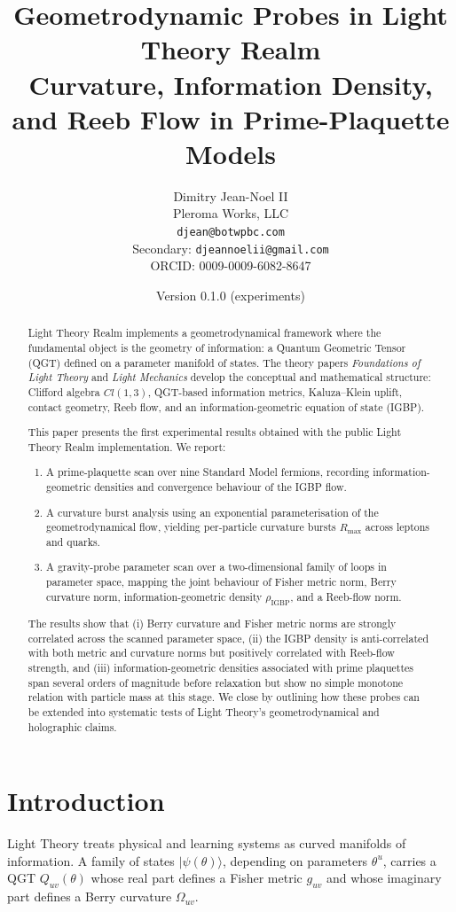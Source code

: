\documentclass[12pt]{article}
\title{Geometrodynamic Probes in Light Theory Realm\\
Curvature, Information Density, and Reeb Flow in Prime-Plaquette Models}
\author{Dimitry Jean-Noel II\\Pleroma Works, LLC\\\texttt{djean@botwpbc.com}\\Secondary: \texttt{djeannoelii@gmail.com}\\ORCID: 0009-0009-6082-8647}
\date{Version 0.1.0 (experiments)}
\begin{document}
\maketitle

\begin{abstract}
Light Theory Realm implements a geometrodynamical framework where the fundamental object is the geometry of information: a Quantum Geometric Tensor (QGT) defined on a parameter manifold of states. The theory papers \emph{Foundations of Light Theory} and \emph{Light Mechanics} develop the conceptual and mathematical structure: Clifford algebra $Cl(1,3)$, QGT-based information metrics, Kaluza--Klein uplift, contact geometry, Reeb flow, and an information-geometric equation of state (IGBP).

This paper presents the first experimental results obtained with the public Light Theory Realm implementation. We report:
\begin{enumerate}
    \item A prime-plaquette scan over nine Standard Model fermions, recording information-geometric densities and convergence behaviour of the IGBP flow.
    \item A curvature burst analysis using an exponential parameterisation of the geometrodynamical flow, yielding per-particle curvature bursts $R_{\max}$ across leptons and quarks.
    \item A gravity-probe parameter scan over a two-dimensional family of loops in parameter space, mapping the joint behaviour of Fisher metric norm, Berry curvature norm, information-geometric density $\rho_{\mathrm{IGBP}}$, and a Reeb-flow norm.
\end{enumerate}

The results show that (i) Berry curvature and Fisher metric norms are strongly correlated across the scanned parameter space, (ii) the IGBP density is anti-correlated with both metric and curvature norms but positively correlated with Reeb-flow strength, and (iii) information-geometric densities associated with prime plaquettes span several orders of magnitude before relaxation but show no simple monotone relation with particle mass at this stage. We close by outlining how these probes can be extended into systematic tests of Light Theory's geometrodynamical and holographic claims.
\end{abstract}

\section{Introduction}
Light Theory treats physical and learning systems as curved manifolds of information. A family of states $\lvert\psi(\theta)\rangle$, depending on parameters $\theta^u$, carries a QGT $Q_{uv}(\theta)$ whose real part defines a Fisher metric $g_{uv}$ and whose imaginary part defines a Berry curvature $\Omega_{uv}$.
\end{document}
